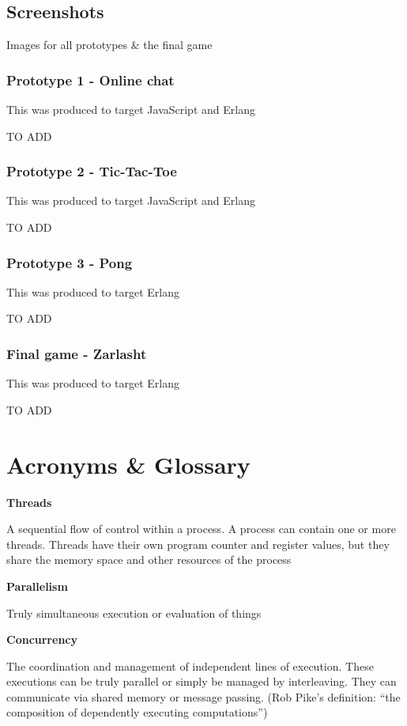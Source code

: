 \documentclass[]{final}
\begin{document}
\section{Screenshots}
Images for all prototypes \& the final game

\subsection{Prototype 1 - Online chat}
This was produced to target JavaScript and Erlang%

TO ADD

\subsection{Prototype 2 - Tic-Tac-Toe}
This was produced to target JavaScript and Erlang%

TO ADD

\subsection{Prototype 3 - Pong}
This was produced to target Erlang%

TO ADD

\subsection{Final game - Zarlasht}
This was produced to target Erlang%

TO ADD
\chapter{Acronyms \& Glossary}

\textbf{Threads}

A sequential flow of control within a process. A process can contain one or more threads.
Threads have their own program counter and register values, but they share the memory space
and other resources of the process

\textbf{Parallelism}

Truly simultaneous execution or evaluation of things

\textbf{Concurrency}

The coordination and management of independent lines of execution. These executions
can be truly parallel or simply be managed by interleaving. They can communicate
via shared memory or message passing. (Rob Pike's definition: “the composition of
dependently executing computations”)
\end{document}
